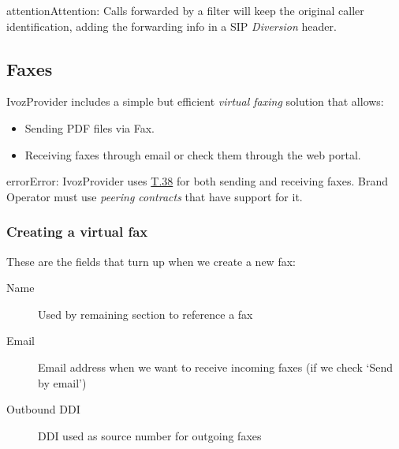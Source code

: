 \documentclass[letterpaper,10pt,english]{sphinxmanual}
\begin{document}
\begin{notice}{attention}{Attention:}
Calls forwarded by a filter will keep the original
caller identification, adding the forwarding info in a SIP
\emph{Diversion} header.
\end{notice}


\subsection{Faxes}
\label{administration_portal/client/residential/faxes:faxes}\label{administration_portal/client/residential/faxes::doc}\label{administration_portal/client/residential/faxes:faxing-system}
IvozProvider includes a simple but efficient \emph{virtual faxing} solution that allows:
\begin{itemize}
\item {} 
Sending PDF files via Fax.

\item {} 
Receiving faxes through email or check them through the web portal.

\end{itemize}

\begin{notice}{error}{Error:}
IvozProvider uses
\href{http://www.voip-info.org/wiki/view/T.38}{T.38} for both sending and receiving
faxes. Brand Operator must use \emph{peering contracts} that have support for it.
\end{notice}


\subsubsection{Creating a virtual fax}
\label{administration_portal/client/residential/faxes:creating-a-virtual-fax}
These are the fields that turn up when we create a new fax:
\begin{description}
\item[{Name}] \leavevmode{}\label{administration_portal/client/residential/faxes:term-name}
Used by remaining section to reference a fax

\item[{Email}] \leavevmode{}\label{administration_portal/client/residential/faxes:term-email}
Email address when we want to receive incoming faxes (if we check `Send
by email')

\item[{Outbound DDI}] \leavevmode{}\label{administration_portal/client/residential/faxes:term-outbound-ddi}
DDI used as source number for outgoing faxes

\end{description}
\end{document}
